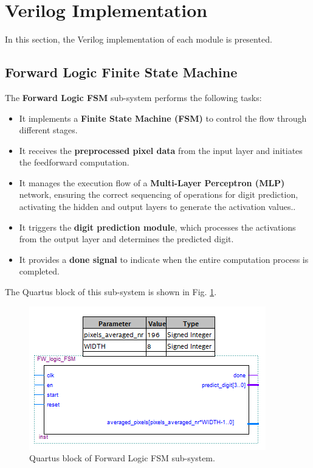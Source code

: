 \documentclass[11pt]{report}
\begin{document}
\section{Verilog Implementation}

In this section, the Verilog implementation of each module is presented.


\subsection{Forward Logic Finite State Machine}

The \textbf{Forward Logic FSM} sub-system performs the following tasks:

\begin{itemize}
    \item It implements a \textbf{Finite State Machine (FSM)} to control the flow through different stages.
    \item It receives the \textbf{preprocessed pixel data} from the input layer and initiates the feedforward computation.
    \item It manages the execution flow of a \textbf{Multi-Layer Perceptron (MLP)} network, ensuring the correct sequencing of operations for digit prediction, activating the hidden and output layers to generate the activation values..
    \item It triggers the \textbf{digit prediction module}, which processes the activations from the output layer and determines the predicted digit.
    \item It provides a \textbf{done signal} to indicate when the entire computation process is completed.
\end{itemize}

The Quartus block of this sub-system is shown in Fig. \ref{fig:FW_logic_FSM}.

\begin{figure}[!h]
    \centering
    \includegraphics[width=0.6\linewidth]{images/neural_network/nn_quartus_block.png}
    \caption{Quartus block of Forward Logic FSM sub-system.}
    \label{fig:FW_logic_FSM}
\end{figure}
\end{document}
